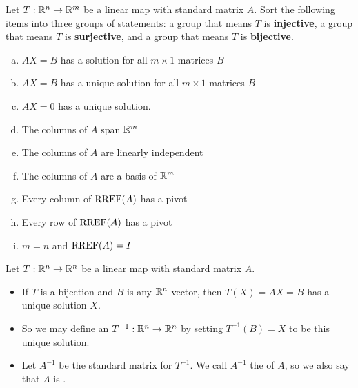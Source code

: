 \begin{applicationActivities}

\begin{activity}{15}
Let $T: \mathbb{R}^n \rightarrow \mathbb{R}^m$ be a linear map with standard matrix $A$.
Sort the following items into three groups of statements: a group that means
\(T\) is \textbf{injective}, a group that means \(T\) is \textbf{surjective},
and a group that means \(T\) is \textbf{bijective}.
\begin{multicols}{2}
\begin{enumerate}[(a)]
\item $AX=B$ has a solution for all $m \times 1$ matrices $B$
\item $AX=B$ has a unique solution for all $m \times 1$ matrices $B$
\item $AX=0$ has a unique solution.
\item The columns of $A$ span $\mathbb{R}^m$
\item The columns of $A$ are linearly independent
\item The columns of $A$ are a basis of $\mathbb{R}^m$
\item Every column of $\operatorname{RREF}(A)$ has a pivot
\item Every row of $\operatorname{RREF}(A)$ has a pivot
\item $m=n$ and $\operatorname{RREF}(A)=I$
\end{enumerate}
\end{multicols}
\end{activity}

\begin{definition}
  Let $T: \mathbb{R}^n \rightarrow \mathbb{R}^n$ be a linear map with standard matrix $A$.
\begin{itemize}
\item  If $T$ is a bijection and $B$ is any $\mathbb{R}^n$ vector, then $T(X)=AX=B$ has a unique solution $X$.
\item So we may define an  $T^{-1} : \mathbb{R}^n \rightarrow \mathbb{R}^n$ by setting $T^{-1}(B)=X$ to be this unique solution.
\item Let $A^{-1}$ be the standard matrix for $T^{-1}$. We call $A^{-1}$ the
 of $A$, so we also say that $A$ is .
\end{itemize}
\end{definition}



\end{applicationActivities}
